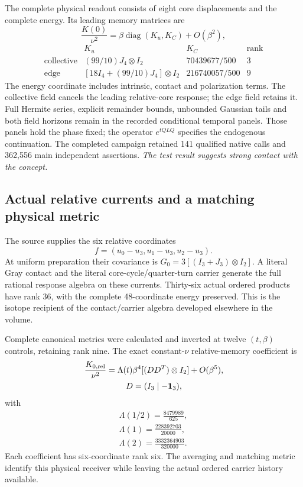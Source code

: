The complete physical readout consists of eight core displacements and
the complete energy. Its leading memory matrices are
\[
 \frac{K(0)}{\nu^2}=
 \beta\operatorname{diag}(K_u,K_C)+O(\beta^2),
\]
{\setlength{\arraycolsep}{3pt}
\[
\begin{array}{c|c|c|c}
 &K_u&K_C&\text{rank}\\
\hline
\text{collective}&(99/10)J_4\otimes I_2&70439677/500&3\\
\text{edge}&[18I_4+(99/10)J_4]\otimes I_2&216740057/500&9
\end{array}
\]
}
The energy coordinate includes intrinsic, contact and polarization terms.
The collective field cancels the leading relative-core response; the edge
field retains it. Full Hermite series, explicit remainder bounds,
unbounded Gaussian tails and both field horizons remain in the recorded
conditional temporal panels. Those panels hold the phase fixed; the
operator \(e^{tQLQ}\) specifies the endogenous continuation.
The completed campaign retained 141 qualified native calls and 362,556
main independent assertions. \emph{The test result suggests strong contact
with the concept.}

\subsection{Actual relative currents and a matching physical metric}

The source supplies the six relative coordinates
\[
 f=(u_0-u_3,u_1-u_3,u_2-u_3).
\]
At uniform preparation their covariance is
\(G_0=3[(I_3+J_3)\otimes I_2]\). A literal Gray contact and the literal
core-cycle/quarter-turn carrier generate the full rational response
algebra on these currents. Thirty-six actual ordered products have
rank 36, with the complete 48-coordinate energy preserved. This is the
isotope recipient of the contact/carrier algebra developed elsewhere in
the volume.

Complete canonical metrics were calculated and inverted at twelve
\((t,\beta)\) controls, retaining rank nine. The exact constant-\(\nu\)
relative-memory coefficient is
\[
\begin{gathered}
\frac{K_{0,\rm rel}}{\nu^2}
 =\Lambda(t)\beta^4[(DD^T)\otimes I_2]+O(\beta^5),\\
 D=(I_3\mid-\mathbf1_3),
\end{gathered}
\]
with
\[
\begin{gathered}
\Lambda(1/2)=\frac{8479989}{625},\\
 \Lambda(1)=\frac{228392703}{20000},\\
 \Lambda(2)=\frac{3332364903}{320000}.
\end{gathered}
\]
Each coefficient has six-coordinate rank six. The averaging and matching
metric identify this physical receiver while leaving the actual ordered
carrier history available.

